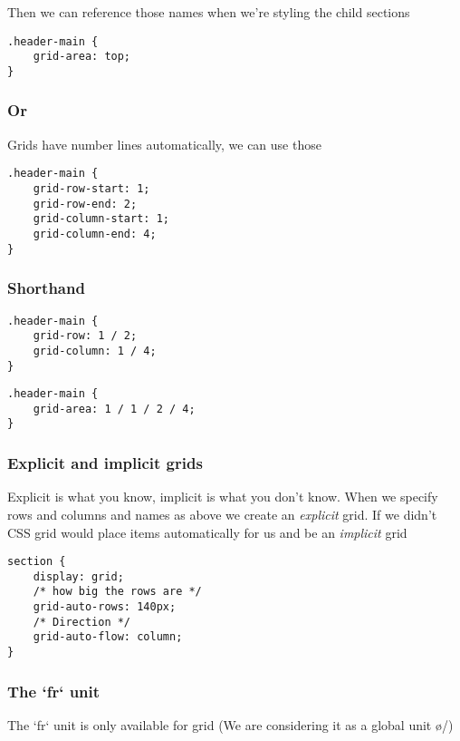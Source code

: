 Then we can reference those names when we're styling the child sections

\begin{verbatim}
.header-main {
	grid-area: top;
}
\end{verbatim}

\subsubsection{Or}

Grids have number lines automatically, we can use those

\begin{verbatim}
.header-main {
	grid-row-start: 1;
	grid-row-end: 2;
	grid-column-start: 1;
	grid-column-end: 4;
}
\end{verbatim}

\subsubsection{Shorthand}

\begin{verbatim}
.header-main {
	grid-row: 1 / 2;
	grid-column: 1 / 4;
}
\end{verbatim}

\begin{verbatim}
.header-main {
	grid-area: 1 / 1 / 2 / 4;
}
\end{verbatim}


\subsubsection{Explicit and implicit grids}

Explicit is what you know, implicit is what you don't know. When we specify rows and columns and names as above we create an \textit{explicit} grid. If we didn't CSS grid would place items automatically for us and be an \textit{implicit} grid


\begin{verbatim}
section {
	display: grid;
	/* how big the rows are */
	grid-auto-rows: 140px;
	/* Direction */
	grid-auto-flow: column;
}
\end{verbatim}


\subsubsection{The `fr` unit}

The `fr` unit is only available for grid
(We are considering it as a global unit \o/)

